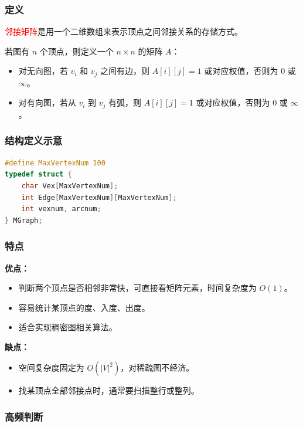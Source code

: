 \documentclass{../../note}
\begin{document}
\subsubsection{定义}

\textcolor{red}{邻接矩阵}是用一个二维数组来表示顶点之间邻接关系的存储方式。

若图有 $n$ 个顶点，则定义一个 $n \times n$ 的矩阵 $A$：

\begin{itemize}
  \item 对无向图，若 $v_i$ 和 $v_j$ 之间有边，则 $A[i][j] = 1$ 或对应权值，否则为 0 或 $\infty$。
  \item 对有向图，若从 $v_i$ 到 $v_j$ 有弧，则 $A[i][j] = 1$ 或对应权值，否则为 0 或 $\infty$。
\end{itemize}

\subsubsection{结构定义示意}

\begin{lstlisting}[language=C]
#define MaxVertexNum 100
typedef struct {
    char Vex[MaxVertexNum];
    int Edge[MaxVertexNum][MaxVertexNum];
    int vexnum, arcnum;
} MGraph;
\end{lstlisting}

\subsubsection{特点}

\textbf{优点：}
\begin{itemize}
  \item 判断两个顶点是否相邻非常快，可直接看矩阵元素，时间复杂度为 $O(1)$。
  \item 容易统计某顶点的度、入度、出度。
  \item 适合实现稠密图相关算法。
\end{itemize}

\textbf{缺点：}
\begin{itemize}
  \item 空间复杂度固定为 $O(|V|^2)$，对稀疏图不经济。
  \item 找某顶点全部邻接点时，通常要扫描整行或整列。
\end{itemize}

\subsubsection{高频判断}
\end{document}
